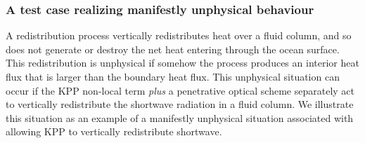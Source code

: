 \subsubsection{A test case realizing manifestly unphysical behaviour}

A redistribution process vertically redistributes heat over a fluid
column, and so does not generate or destroy the net heat entering
through the ocean surface.  This redistribution is unphysical if
somehow the process produces an interior heat flux that is larger than
the boundary heat flux.  This unphysical situation can occur if the
KPP non-local term {\it plus} a penetrative optical scheme separately
act to vertically redistribute the shortwave radiation in a fluid
column.  We illustrate this situation as an example of a manifestly
unphysical situation associated with allowing KPP to vertically
redistribute shortwave.

